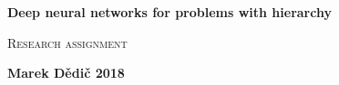 \documentclass[a4paper,12pt]{report}
\begin{document}
\thispagestyle{empty}

\centering

\begin{minipage}[t][10cm][t]{15cm}
\end{minipage}

\vspace{1cm}

\textbf{\Large Deep neural networks for problems with hierarchy \\
}

\vspace{2ex}

{\Large \textsc{Research assignment}\\}

\vspace{2ex}

\textbf{\large Marek Dědič  2018}\\
\end{document}

